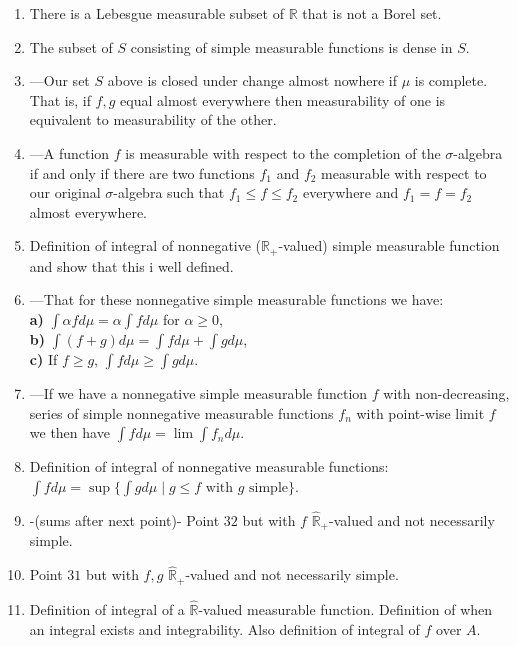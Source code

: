 \documentclass{article}
\begin{document}
\begin{enumerate}
\begin{align*}
        &\textbf{c) } \text{for $C$ closed }f^{-1}(C)\in\mathcal{A},\\
        &\textbf{d) } \text{for $B$ Borel }f^{-1}(B)\in\mathcal{A}.
    \end{align*}
    \item There is a Lebesgue measurable subset of $\mathbb{R}$ that is not a Borel set.
    \item The subset of $S$ consisting of simple measurable functions is dense in $S$.
    \item ---Our set $S$ above is closed under change almost nowhere if $\mu$ is complete. That is, if $f,g$ equal almost everywhere then measurability of one is equivalent to measurability of the other.
    \item ---A function $f$ is measurable with respect to the completion of the $\sigma$-algebra if and only if there are two functions $f_1$ and $f_2$ measurable with respect to our original $\sigma$-algebra such that $f_1\leq f \leq f_2$ everywhere and $f_1=f=f_2$ almost everywhere.
    \item Definition of integral of nonnegative ($\mathbb{R}_+$-valued) simple measurable function and show that this i well defined.
    \item ---That for these nonnegative simple measurable functions we have:\\
    \textbf{a)} $\int \alpha fd\mu = \alpha\int fd\mu$ for $\alpha \geq 0$,\\
    \textbf{b)} $\int (f+g)d\mu = \int fd\mu +\int gd\mu$,\\
    \textbf{c)} If $f\geq g$, $\int fd\mu \geq \int gd\mu$.
    \item ---If we have a nonnegative simple measurable function $f$ with non-decreasing, series of simple nonnegative measurable functions $f_n$ with point-wise limit $f$ we then have $\int f d\mu = \lim \int f_n d\mu$.
    \item Definition of integral of nonnegative measurable functions: $\int fd\mu = \sup\{\int g d\mu \mid g\leq f \text{ with $g$ simple}\}$.
    \item -(sums after next point)- Point $32$ but with $f$  $\hat{\mathbb{R}}_+$-valued and not necessarily simple.
    \item Point $31$ but with $f, g$  $\hat{\mathbb{R}}_+$-valued and not necessarily simple.
    \item Definition of integral of a $\hat{\mathbb{R}}$-valued measurable function. Definition of when an integral exists and integrability. Also definition of integral of $f$ over $A$.

\end{enumerate}
\end{document}

